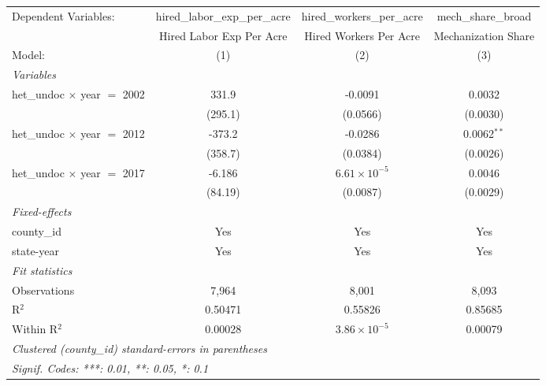 
\begingroup
\centering
\begin{tabular}{lccc}
   \tabularnewline \midrule \midrule
   Dependent Variables:                & hired\_labor\_exp\_per\_acre     & hired\_workers\_per\_acre    & mech\_share\_broad\\    
                                       & Hired Labor Exp Per Acre         & Hired Workers Per Acre       & Mechanization Share \\   
   Model:                              & (1)                              & (2)                          & (3)\\  
   \midrule
   \emph{Variables}\\
   het\_undoc $\times$ year $=$ 2002   & 331.9                            & -0.0091                      & 0.0032\\   
                                       & (295.1)                          & (0.0566)                     & (0.0030)\\   
   het\_undoc $\times$ year $=$ 2012   & -373.2                           & -0.0286                      & 0.0062$^{**}$\\   
                                       & (358.7)                          & (0.0384)                     & (0.0026)\\   
   het\_undoc $\times$ year $=$ 2017   & -6.186                           & $6.61\times 10^{-5}$         & 0.0046\\   
                                       & (84.19)                          & (0.0087)                     & (0.0029)\\   
   \midrule
   \emph{Fixed-effects}\\
   county\_id                          & Yes                              & Yes                          & Yes\\  
   state-year                          & Yes                              & Yes                          & Yes\\  
   \midrule
   \emph{Fit statistics}\\
   Observations                        & 7,964                            & 8,001                        & 8,093\\  
   R$^2$                               & 0.50471                          & 0.55826                      & 0.85685\\  
   Within R$^2$                        & 0.00028                          & $3.86\times 10^{-5}$         & 0.00079\\  
   \midrule \midrule
   \multicolumn{4}{l}{\emph{Clustered (county\_id) standard-errors in parentheses}}\\
   \multicolumn{4}{l}{\emph{Signif. Codes: ***: 0.01, **: 0.05, *: 0.1}}\\
\end{tabular}
\par\endgroup


